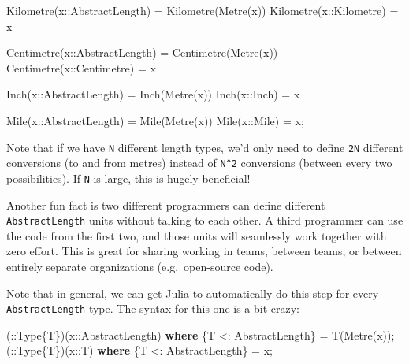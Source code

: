 \documentclass[
]{article}
\newenvironment{Shaded}{\begin{snugshade}}{\end{snugshade}}
\newcommand{\DataTypeTok}[1]{\textcolor[rgb]{0.68,0.00,0.00}{#1}}
\newcommand{\FunctionTok}[1]{\textcolor[rgb]{0.28,0.35,0.67}{#1}}
\newcommand{\KeywordTok}[1]{\textcolor[rgb]{0.00,0.23,0.31}{\textbf{#1}}}
\newcommand{\NormalTok}[1]{\textcolor[rgb]{0.00,0.23,0.31}{#1}}
\newcommand{\OperatorTok}[1]{\textcolor[rgb]{0.37,0.37,0.37}{#1}}
\begin{document}
\begin{Shaded}
\begin{Highlighting}[]
\FunctionTok{Kilometre}\NormalTok{(x}\OperatorTok{::}\DataTypeTok{AbstractLength}\NormalTok{) }\OperatorTok{=} \FunctionTok{Kilometre}\NormalTok{(}\FunctionTok{Metre}\NormalTok{(x))}
\FunctionTok{Kilometre}\NormalTok{(x}\OperatorTok{::}\DataTypeTok{Kilometre}\NormalTok{) }\OperatorTok{=}\NormalTok{ x}

\FunctionTok{Centimetre}\NormalTok{(x}\OperatorTok{::}\DataTypeTok{AbstractLength}\NormalTok{) }\OperatorTok{=} \FunctionTok{Centimetre}\NormalTok{(}\FunctionTok{Metre}\NormalTok{(x))}
\FunctionTok{Centimetre}\NormalTok{(x}\OperatorTok{::}\DataTypeTok{Centimetre}\NormalTok{) }\OperatorTok{=}\NormalTok{ x}

\FunctionTok{Inch}\NormalTok{(x}\OperatorTok{::}\DataTypeTok{AbstractLength}\NormalTok{) }\OperatorTok{=} \FunctionTok{Inch}\NormalTok{(}\FunctionTok{Metre}\NormalTok{(x))}
\FunctionTok{Inch}\NormalTok{(x}\OperatorTok{::}\DataTypeTok{Inch}\NormalTok{) }\OperatorTok{=}\NormalTok{ x}

\FunctionTok{Mile}\NormalTok{(x}\OperatorTok{::}\DataTypeTok{AbstractLength}\NormalTok{) }\OperatorTok{=} \FunctionTok{Mile}\NormalTok{(}\FunctionTok{Metre}\NormalTok{(x))}
\FunctionTok{Mile}\NormalTok{(x}\OperatorTok{::}\DataTypeTok{Mile}\NormalTok{) }\OperatorTok{=}\NormalTok{ x;}
\end{Highlighting}
\end{Shaded}

Note that if we have \texttt{N} different length types, we'd only need
to define \texttt{2N} different conversions (to and from metres) instead
of \texttt{N\^{}2} conversions (between every two possibilities). If
\texttt{N} is large, this is hugely beneficial!

Another fun fact is two different programmers can define different
\texttt{AbstractLength} units without talking to each other. A third
programmer can use the code from the first two, and those units will
seamlessly work together with zero effort. This is great for sharing
working in teams, between teams, or between entirely separate
organizations (e.g.~open-source code).

Note that in general, we can get Julia to automatically do this step for
every \texttt{AbstractLength} type. The syntax for this one is a bit
crazy:

\begin{Shaded}
\begin{Highlighting}[]
\NormalTok{(}\OperatorTok{::}\DataTypeTok{Type\{T\}}\NormalTok{)(x}\OperatorTok{::}\DataTypeTok{AbstractLength}\NormalTok{) }\KeywordTok{where}\NormalTok{ \{T }\OperatorTok{\textless{}:}\DataTypeTok{ AbstractLength}\NormalTok{\} }\OperatorTok{=} \FunctionTok{T}\NormalTok{(}\FunctionTok{Metre}\NormalTok{(x));}
\NormalTok{(}\OperatorTok{::}\DataTypeTok{Type\{T\}}\NormalTok{)(x}\OperatorTok{::}\DataTypeTok{T}\NormalTok{) }\KeywordTok{where}\NormalTok{ \{T }\OperatorTok{\textless{}:}\DataTypeTok{ AbstractLength}\NormalTok{\} }\OperatorTok{=}\NormalTok{ x;}
\end{Highlighting}
\end{Shaded}
\end{document}
